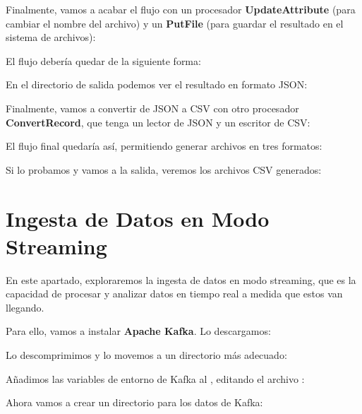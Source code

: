 \documentclass{../../../miPlantilla}
\begin{document}

Finalmente, vamos a acabar el flujo con un procesador \textbf{UpdateAttribute} (para cambiar el nombre del archivo) y un \textbf{PutFile} (para guardar el resultado en el sistema de archivos):


\newpage

El flujo debería quedar de la siguiente forma:


En el directorio de salida podemos ver el resultado en formato JSON:


Finalmente, vamos a convertir de JSON a CSV con otro procesador \textbf{ConvertRecord}, que tenga un lector de JSON y un escritor de CSV:


El flujo final quedaría así, permitiendo generar archivos en tres formatos:


Si lo probamos y vamos a la salida, veremos los archivos CSV generados:


\newpage

\section{Ingesta de Datos en Modo Streaming}
En este apartado, exploraremos la ingesta de datos en modo streaming, que es la capacidad de procesar y analizar datos en tiempo real a medida que estos van llegando.

Para ello, vamos a instalar \textbf{Apache Kafka}. Lo descargamos:


Lo descomprimimos y lo movemos a un directorio más adecuado:


Añadimos las variables de entorno de Kafka al , editando el archivo :


Ahora vamos a crear un directorio para los datos de Kafka:


\newpage
\end{document}
